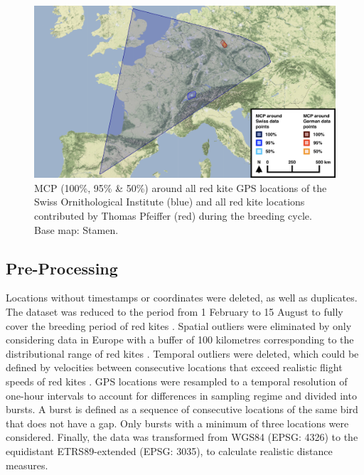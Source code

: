 \begin{figure}[H]
\centering
\includegraphics[width=1\textwidth]{figures/maps/All_data_MCP.png}
\caption[MCP (100\%, 95\% \& 50\%) around all red kite GPS locations of Switzerland and Germany during the breeding cycle]{MCP (100\%, 95\% \& 50\%) around all red kite GPS locations of the Swiss Ornithological Institute (blue) and all red kite locations contributed by Thomas Pfeiffer (red) during the breeding cycle. Base map: Stamen.}
\label{figure:map_breeding_area}
\end{figure}



\subsection{Pre-Processing} \label{subsection:preprocessing}
Locations without timestamps or coordinates were deleted, as well as duplicates. The dataset was reduced to the period from 1 February to 15 August to fully cover the  breeding period of red kites \parencite{aebischer2021rotmilan}. Spatial outliers were eliminated by only considering data in Europe with a buffer of 100 kilometres corresponding to the distributional range of red kites \parencite{garcia2022seasonal, literak2022disperal, mougeot2011breeding, panter2022age, seoane2003effects}. Temporal outliers were deleted, which could be defined by velocities between consecutive locations that exceed realistic flight speeds of red kites \parencite{garcia2022seasonal}. GPS locations were resampled to a temporal resolution of one-hour intervals to account for differences in sampling regime and divided into bursts. A burst is defined as a sequence of consecutive locations of the same bird that does not have a gap. Only bursts with a minimum of three locations were considered. Finally, the data was transformed from WGS84 (EPSG: 4326) to the equidistant ETRS89-extended (EPSG: 3035), to calculate realistic distance measures.



